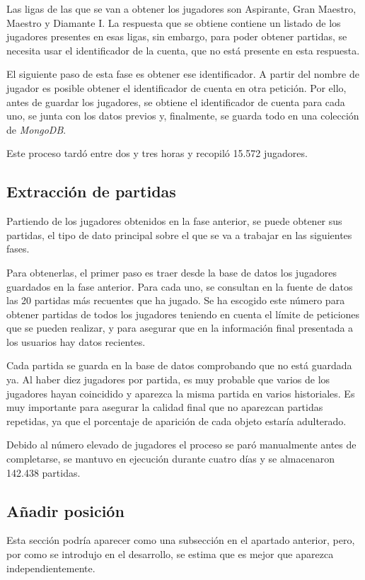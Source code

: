 Las ligas de las que se van a obtener los jugadores son Aspirante, Gran Maestro, Maestro y Diamante I. La respuesta que se obtiene contiene un listado de los jugadores presentes en esas ligas, sin embargo, para poder obtener partidas, se necesita usar el identificador de la cuenta, que no está presente en esta respuesta.

El siguiente paso de esta fase es obtener ese identificador. A partir del nombre de jugador es posible obtener el identificador de cuenta en otra petición. Por ello, antes de guardar los jugadores, se obtiene el identificador de cuenta para cada uno, se junta con los datos previos y, finalmente, se guarda todo en una colección de \textit{MongoDB}.

Este proceso tardó entre dos y tres horas y recopiló 15.572 jugadores.

\subsection{Extracción de partidas}
Partiendo de los jugadores obtenidos en la fase anterior, se puede obtener sus partidas, el tipo de dato principal sobre el que se va a trabajar en las siguientes fases.

Para obtenerlas, el primer paso es traer desde la base de datos los jugadores guardados en la fase anterior. Para cada uno, se consultan en la fuente de datos las 20 partidas más recuentes que ha jugado. Se ha escogido este número para obtener partidas de todos los jugadores teniendo en cuenta el límite de peticiones que se pueden realizar, y para asegurar que en la información final presentada a los usuarios hay datos recientes.

Cada partida se guarda en la base de datos comprobando que no está guardada ya. Al haber diez jugadores por partida, es muy probable que varios de los jugadores hayan coincidido y aparezca la misma partida en varios historiales. Es muy importante para asegurar la calidad final que no aparezcan partidas repetidas, ya que el porcentaje de aparición de cada objeto estaría adulterado.

Debido al número elevado de jugadores el proceso se paró manualmente antes de completarse, se mantuvo en ejecución durante cuatro días y se almacenaron 142.438 partidas.

\subsection{Añadir posición}
Esta sección podría aparecer como una subsección en el apartado anterior, pero, por como se introdujo en el desarrollo, se estima que es mejor que aparezca independientemente.


